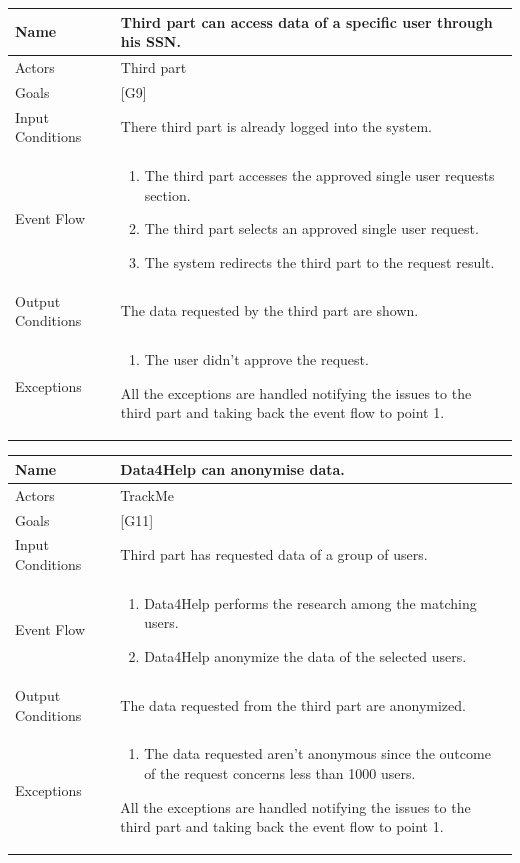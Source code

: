\documentclass{article}
\begin{document}
\begin{center}
    \begin{tabular}{ | l | p{10cm} |}
    \hline
    Name & Third part can access data of a specific user through his SSN.\\ \hline
    Actors & Third part\\ \hline
   	Goals & {[G9]}\\ \hline
    Input Conditions & There third part is already logged into the system.\\ \hline
    Event Flow & \begin{enumerate}
    	\item The third part accesses the approved single user requests section.
    	\item The third part selects an approved single user request. 
    	\item The system redirects the third part to the request result.
    \end{enumerate} \\ \hline
    Output Conditions & The data requested by the third part are shown.  \\ \hline
    Exceptions & \begin{enumerate}
   \item The user didn't approve the request.
\end{enumerate} All the exceptions are handled notifying the issues to the third part and taking back the event flow to point 1.    \\ \hline
    \end{tabular}
\end{center}

\begin{center}
    \begin{tabular}{ | l | p{10cm} |}
    \hline
    Name & Data4Help can anonymise data. \\ \hline
    Actors & TrackMe\\ \hline
   	Goals & {[G11]}\\ \hline
    Input Conditions & Third part has requested data of a group of users.\\ \hline
    Event Flow & \begin{enumerate}
		\item Data4Help performs the research among the matching users.
		\item Data4Help anonymize the data of the selected users.
    \end{enumerate} \\ \hline
    Output Conditions & The data requested from the third part are anonymized. \\ \hline
    Exceptions & \begin{enumerate}
  		\item The data requested aren’t anonymous since the outcome of the request concerns less than 1000 users.
\end{enumerate} All the exceptions are handled notifying the issues to the third part and taking back the event flow to point 1.    \\ \hline
    \end{tabular}
\end{center}
\end{document}
